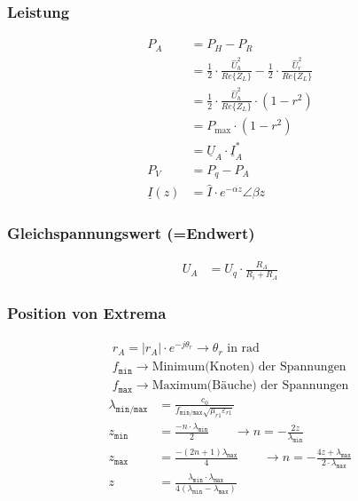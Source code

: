 \subsubsection{Leistung}
\begin{align*}
    P_{A}            & = P_{H}-P_{R}                                                                                                 \\
                     & = \frac{1}{2} \cdot \frac{\hat{U}_{h}^{2}}{Re\{Z_{L}\}}-\frac{1}{2} \cdot \frac{\hat{U}_{r}^{2}}{Re\{Z_{L}\}} \\
                     & =\frac{1}{2} \cdot \frac{\hat{U}_{h}^{2}}{Re\{Z_{L}\}} \cdot\left(1-r^{2}\right)                              \\
                     & = P_{\max} \cdot\left(1-r^{2}\right)                                                                          \\
                     & = \underline{U}_A\cdot\underline{I}_A^*                                                                       \\
    P_V              & = P_q -P_A                                                                                                    \\
    \underline{I}(z) & = \hat{I}\cdot e^{-\alpha z}\angle \beta z
	\end{align*}
\subsubsection{Gleichspannungswert (=Endwert)}
\begin{align*}
    U_A & = U_q\cdot\frac{R_A}{R_i+R_A}
\end{align*}

\subsubsection{Position von Extrema}
\begin{gather*}
    \boxed{r_A = |r_A|\cdot e^{-j\theta_r}}\rightarrow\theta_r\text{ in rad}\\
    f_\texttt{min}\rightarrow \text{Minimum(Knoten) der Spannungen}\\
    f_\texttt{max}\rightarrow \text{Maximum(Bäuche) der Spannungen}
\end{gather*}
\begin{align*}
    \lambda_\texttt{min/max} & = \frac{c_0}{f_\texttt{min/max}\sqrt{\mu_{r1}\varepsilon_{r1}}}                                                                                                 \\
    z_\texttt{min}           & =\frac{-n\cdot\lambda_\texttt{min}}{2}                                        \qquad\rightarrow n = -\frac{2z}{\lambda_\texttt{min}}                            \\
    z_\texttt{max}           & =\frac{-(2n+1)\lambda_\texttt{max}}{4}                                        \qquad\rightarrow n = -\frac{4z+\lambda_\texttt{max}}{2\cdot\lambda_\texttt{max}} \\
    z                        & = \frac{\lambda_\texttt{min}\cdot\lambda_\texttt{max}}{4(\lambda_\texttt{min}-\lambda_\texttt{max})}
\end{align*}



